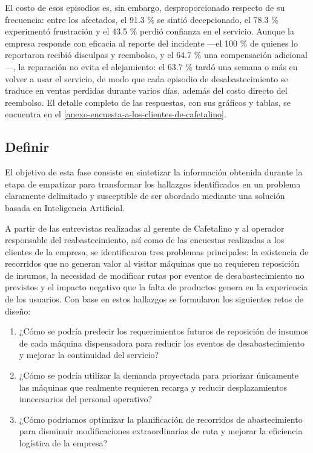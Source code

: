 El costo de esos episodios es, sin embargo, desproporcionado respecto de su frecuencia: entre los afectados, el 91.3 \% se sintió decepcionado, el 78.3 \% experimentó frustración y el 43.5 \% perdió confianza en el servicio. Aunque la empresa responde con eficacia al reporte del incidente —el 100 \% de quienes lo reportaron recibió disculpas y reembolso, y el 64.7 \% una compensación adicional—, la reparación no evita el alejamiento: el 63.7 \% tardó una semana o más en volver a usar el servicio, de modo que cada episodio de desabastecimiento se traduce en ventas perdidas durante varios días, además del costo directo del reembolso. El detalle completo de las respuestas, con sus gráficos y tablas, se encuentra en el \ref{anexo-encuesta-a-los-clientes-de-cafetalino}.

\subsection{Definir}\label{definir}

El objetivo de esta fase consiste en sintetizar la información obtenida durante la etapa de empatizar para transformar los hallazgos identificados en un problema claramente delimitado y susceptible de ser abordado mediante una solución basada en Inteligencia Artificial.

A partir de las entrevistas realizadas al gerente de Cafetalino y al operador responsable del reabastecimiento, así como de las encuestas realizadas a los clientes de la empresa, se identificaron tres problemas principales: la existencia de recorridos que no generan valor al visitar máquinas que no requieren reposición de insumos, la necesidad de modificar rutas por eventos de desabastecimiento no previstos y el impacto negativo que la falta de productos genera en la experiencia de los usuarios. Con base en estos hallazgos se formularon los siguientes retos de diseño:

\begin{enumerate}
\def\labelenumi{\arabic{enumi}.}
\item
  ¿Cómo se podría predecir los requerimientos futuros de reposición de insumos de cada máquina dispensadora para reducir los eventos de desabastecimiento y mejorar la continuidad del servicio?
\item
  ¿Cómo se podría utilizar la demanda proyectada para priorizar únicamente las máquinas que realmente requieren recarga y reducir desplazamientos innecesarios del personal operativo?
\item
  ¿Cómo podríamos optimizar la planificación de recorridos de abastecimiento para disminuir modificaciones extraordinarias de ruta y mejorar la eficiencia logística de la empresa?
\end{enumerate}

